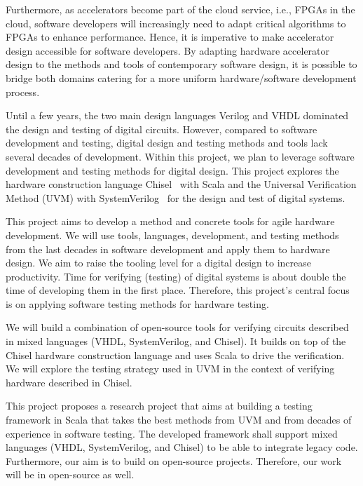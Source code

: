 \documentclass[conference]{IEEEtran}
\begin{document}
Furthermore, as accelerators become part of the cloud service, i.e., FPGAs in the cloud,
software developers will increasingly need to adapt critical algorithms to FPGAs to enhance performance.
Hence, it is imperative to make accelerator design accessible for software developers.
By adapting hardware accelerator design to the methods and tools of contemporary software design,
it is possible to bridge both domains catering for a more uniform hardware/software development process.

Until a few years, the two main design languages Verilog and VHDL dominated the
design and testing of digital circuits.
However, compared to software development and testing, digital design and testing methods
and tools lack several decades of development. Within this project, we plan to
leverage software development and testing methods for digital design.
This project explores the hardware construction language Chisel~\cite{chisel:dac2012} with Scala
and the Universal Verification Method (UVM) with SystemVerilog~\cite{SystemVerilog} for
the design and test of digital systems.

This project aims to develop a method and concrete tools for agile hardware development.
We will use tools, languages, development, and testing methods from the last decades in
software development and apply them to hardware design.
We aim to raise the tooling level for a digital design to increase productivity.
Time for verifying (testing) of digital systems is about double the time of developing
them in the first place.
Therefore, this project's central focus is on applying software
testing methods for hardware testing.

We will build a combination of open-source tools for verifying
circuits described in mixed languages (VHDL, SystemVerilog, and Chisel).
It builds on top of the Chisel hardware construction language and uses Scala to drive the verification. 
We will explore the testing strategy used in UVM in the context of verifying hardware described in Chisel.

This project proposes a research project that aims at building a testing framework
in Scala that takes the best methods from UVM and from decades of experience
in software testing.
The developed framework shall support mixed languages (VHDL, SystemVerilog, and Chisel)
to be able to integrate legacy code.
Furthermore, our aim is to build on open-source projects. Therefore, our
work will be in open-source as well.
\end{document}
